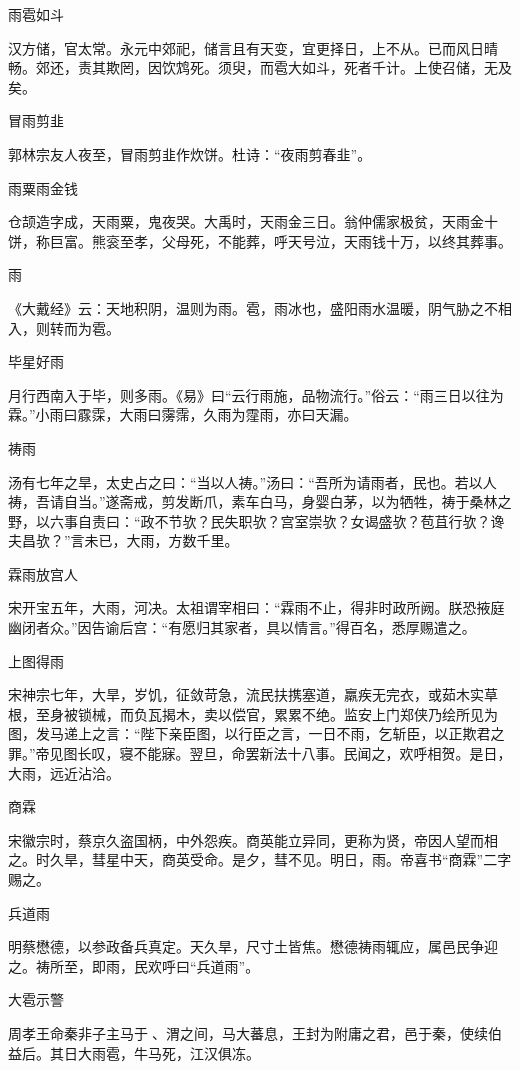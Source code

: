 \documentclass[a4paper,12pt,UTF8,twoside]{ctexbook}
\begin{document}
	雨雹如斗
	
	汉方储，官太常。永元中郊祀，储言且有天变，宜更择日，上不从。已而风日晴畅。郊还，责其欺罔，因饮鸩死。须臾，而雹大如斗，死者千计。上使召储，无及矣。
	
	冒雨剪韭
	
	郭林宗友人夜至，冒雨剪韭作炊饼。杜诗：“夜雨剪春韭”。
	
	雨粟雨金钱
	
	仓颉造字成，天雨粟，鬼夜哭。大禹时，天雨金三日。翁仲儒家极贫，天雨金十饼，称巨富。熊衮至孝，父母死，不能葬，呼天号泣，天雨钱十万，以终其葬事。
	
	雨
	
	《大戴经》云：天地积阴，温则为雨。雹，雨冰也，盛阳雨水温暖，阴气胁之不相入，则转而为雹。
	
	毕星好雨
	
	月行西南入于毕，则多雨。《易》曰“云行雨施，品物流行。”俗云：“雨三日以往为霖。”小雨曰霡霂，大雨曰霶霈，久雨为霪雨，亦曰天漏。
	
	祷雨
	
	汤有七年之旱，太史占之曰：“当以人祷。”汤曰：“吾所为请雨者，民也。若以人祷，吾请自当。”遂斋戒，剪发断爪，素车白马，身婴白茅，以为牺牲，祷于桑林之野，以六事自责曰：“政不节欤？民失职欤？宫室崇欤？女谒盛欤？苞苴行欤？谗夫昌欤？”言未已，大雨，方数千里。
	
	霖雨放宫人
	
	宋开宝五年，大雨，河决。太祖谓宰相曰：“霖雨不止，得非时政所阙。朕恐掖庭幽闭者众。”因告谕后宫：“有愿归其家者，具以情言。”得百名，悉厚赐遣之。
	
	上图得雨
	
	宋神宗七年，大旱，岁饥，征敛苛急，流民扶携塞道，羸疾无完衣，或茹木实草根，至身被锁械，而负瓦揭木，卖以偿官，累累不绝。监安上门郑侠乃绘所见为图，发马递上之言：“陛下亲臣图，以行臣之言，一日不雨，乞斩臣，以正欺君之罪。”帝见图长叹，寝不能寐。翌旦，命罢新法十八事。民闻之，欢呼相贺。是日，大雨，远近沾洽。
	
	商霖
	
	宋徽宗时，蔡京久盗国柄，中外怨疾。商英能立异同，更称为贤，帝因人望而相之。时久旱，彗星中天，商英受命。是夕，彗不见。明日，雨。帝喜书“商霖”二字赐之。
	
	兵道雨
	
	明蔡懋德，以参政备兵真定。天久旱，尺寸土皆焦。懋德祷雨辄应，属邑民争迎之。祷所至，即雨，民欢呼曰“兵道雨”。
	
	大雹示警
	
	周孝王命秦非子主马于、渭之间，马大蕃息，王封为附庸之君，邑于秦，使续伯益后。其日大雨雹，牛马死，江汉俱冻。
	
\end{document}
